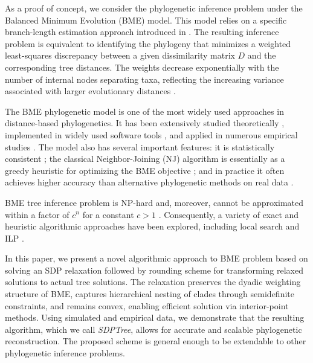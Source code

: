 \documentclass{article}
\begin{document}
As a proof of concept, we consider the phylogenetic inference problem under the Balanced Minimum Evolution (BME) model. This model relies on a specific branch-length estimation approach introduced in \cite{pauplin2000direct}. The resulting inference problem is equivalent to identifying the phylogeny that minimizes a weighted least-squares discrepancy between a given dissimilarity matrix $D$ and the corresponding tree distances. The weights decrease exponentially with the number of internal nodes separating taxa, reflecting the increasing variance associated with larger evolutionary distances \cite{desper2004theoretical}.

The BME phylogenetic model is one of the most widely used approaches in distance-based phylogenetics. It has been extensively studied theoretically \cite{desper2002fast,desper2004theoretical,pauplin2000direct,semple2004cyclic,forcey2016facets}, implemented in widely used software tools \cite{lefort2015fastme}, and applied in numerous empirical studies \cite{wick2021trycycler,edger2019origin,librado2021origins}. The model also has several important features:  it is statistically consistent \cite{semple2004cyclic,desper2004theoretical}; the classical Neighbor-Joining (NJ) algorithm is essentially as a greedy heuristic for optimizing the BME objective \cite{gascuel2006neighbor}; and in practice it often achieves higher accuracy than alternative phylogenetic methods on real data \cite{spirin2024phylobench}.

BME tree inference problem is NP-hard and, moreover, cannot be approximated within a factor of $c^n$ for a constant $c>1$ \cite{fiorini2012approximating,frohn2021approximability}. Consequently, a variety of exact and heuristic algorithmic approaches have been explored, including local search  \cite{desper2002fast,gasparin2023evolution,lefort2015fastme} and ILP \cite{forcey2016facets,catanzaro2020balanced,catanzaro2012balanced,catanzaro2026optimizing,catanzaro2025new}.

 In this paper, we present a novel algorithmic approach to BME problem based on solving an SDP relaxation followed by rounding scheme for transforming relaxed solutions to actual tree solutions. The relaxation preserves the dyadic weighting structure of BME, captures hierarchical nesting of clades through semidefinite constraints, and remains convex, enabling efficient solution via interior-point methods. Using simulated and empirical data, we demonstrate that the resulting algorithm, which we call {\it SDPTree}, allows for accurate and scalable phylogenetic reconstruction. The proposed scheme is general enough to be extendable to other phylogenetic inference problems.
\end{document}
